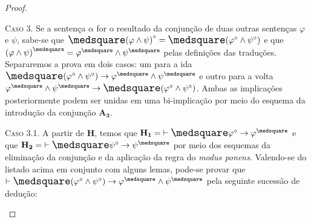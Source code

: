 \begin{theorem}
\begin{proof}
        \begin{case}
            \textsc{Caso 3.}
            Se a sentença $\alpha$ for o resultado da conjunção de duas outras sentenças $\varphi$ e $\psi$, sabe-se que $\nec{(\varphi\wedge\psi)}^\circ=\nec(\varphi^\circ\wedge\psi^\circ)$ e que ${(\varphi\wedge\psi)}^\medsquare=\varphi^\medsquare\wedge\psi^\medsquare$ pelas definições das traduções.
            Separaremos a prova em dois casos: um para a ida $\nec(\varphi^\circ\wedge\psi^\circ)\to\varphi^\medsquare\wedge\psi^\medsquare$ e outro para a volta $\varphi^\medsquare\wedge\psi^\medsquare\to\nec(\varphi^\circ\wedge\psi^\circ)$. Ambas as implicações posteriormente podem ser unidas em uma bi-implicação por meio do esquema da introdução da conjunção \hyperref[MA3]{$\mathbf{A_3}$}.
        \end{case}

            \begin{subcase}
                \textsc{Caso 3.1.}
                A partir de $\mathbf{H}$, temos que $\mathbf{H_1}={\entails\nec\varphi^\circ\to\varphi^\medsquare}$ e que $\mathbf{H_2}={\entails\nec\psi^\circ\to\psi^\medsquare}$ por meio dos esquemas da eliminação da conjunção e da aplicação da regra do \emph{modus ponens}.
                Valendo-se do listado acima em conjunto com alguns lemas, pode-se provar que $\entails\nec(\varphi^\circ\wedge\psi^\circ)\to\varphi^\medsquare\wedge\psi^\medsquare$ pela seguinte sucessão de dedução:


\end{subcase}
\end{proof}
\end{theorem}
